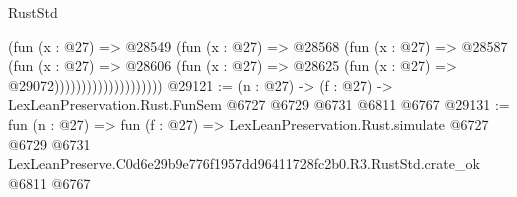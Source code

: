 \begin{lexlean}{RustStd}
\begin{coremodule}
                                (fun (x : @27) =>
                                @28549
                                  (fun (x : @27) =>
                                  @28568
                                    (fun (x : @27) =>
                                    @28587
                                      (fun (x : @27) =>
                                      @28606
                                        (fun (x : @27) =>
                                        @28625 (fun (x : @27) => @29072))))))))))))))))))))
@29121 := (n : @27) -> (f : @27) -> LexLeanPreservation.Rust.FunSem @6727 @6729 @6731 @6811 @6767
@29131 := fun (n : @27) =>
  fun (f : @27) =>
  LexLeanPreservation.Rust.simulate
    @6727
    @6729
    @6731
    LexLeanPreserve.C0d6e29b9e776f1957dd96411728fc2b0.R3.RustStd.crate_ok
    @6811
    @6767
\end{coremodule}
\end{lexlean}

